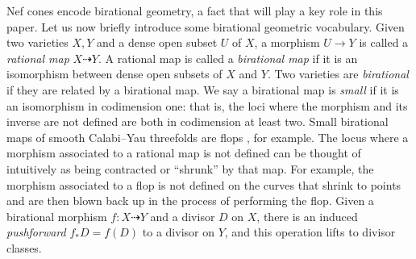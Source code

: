 \documentclass[11pt,dvipsnames]{article}
\theoremstyle{definition}
\begin{document}
Nef cones encode birational geometry, a fact that will play a key role in this paper. Let us now briefly introduce some birational geometric vocabulary. Given two varieties $X, Y$ and a dense open subset $U$ of $X$, a morphism $U \to Y$ is called a \textit{rational map} $X \dashrightarrow Y$. A rational map is called a \textit{birational map} if it is an isomorphism between dense open subsets of $X$ and $Y$. Two varieties are \textit{birational} if they are related by a birational map. We say a birational map is \textit{small} if it is an isomorphism in codimension one: that is, the loci where the morphism and its inverse are not defined are both in codimension at least two. Small birational maps of smooth Calabi--Yau threefolds are flops \cite{katz1992gorenstein, Hori:2003ic}, for example. The locus where a morphism associated to a rational map is not defined can be thought of intuitively as being contracted or ``shrunk'' by that map. For example, the morphism associated to a flop is not defined on the curves that shrink to points and are then blown back up in the process of performing the flop. 
Given a birational morphism $f : X \dashrightarrow Y$ and a divisor $D$ on $X$, there is an induced \textit{pushforward} $f_* D = f(D)$ to a divisor on $Y$, and this operation lifts to divisor classes.
\end{document}
